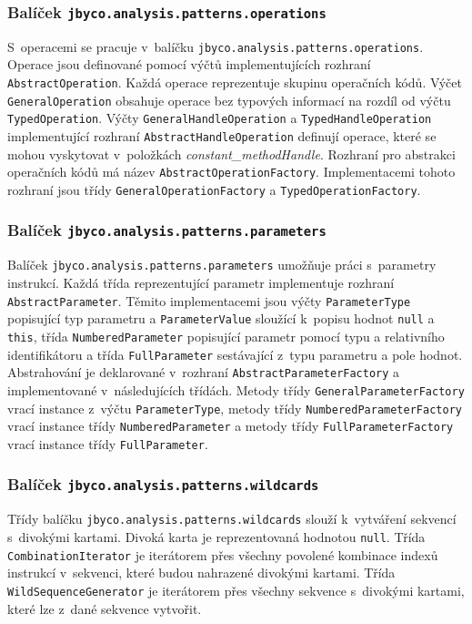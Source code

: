 \subsubsection{Balíček \texttt{jbyco.analysis.patterns.operations}}

S~operacemi se pracuje v~balíčku \texttt{jbyco.analysis.patterns.operations}. Operace jsou definované pomocí výčtů implementujících rozhraní \texttt{AbstractOperation}. Každá operace reprezentuje skupinu operačních kódů. Výčet \texttt{GeneralOperation} obsahuje operace bez typových informací na rozdíl od výčtu \texttt{TypedOperation}. Výčty \texttt{GeneralHandleOperation} a \texttt{TypedHandleOperation} implementující rozhraní \texttt{AbstractHandleOperation} definují operace, které se mohou vyskytovat v~položkách \textit{constant\_methodHandle}. Rozhraní pro abstrakci operačních kódů má název \texttt{AbstractOperationFactory}. Implementacemi tohoto rozhraní jsou třídy \texttt{GeneralOperationFactory} a \texttt{TypedOperationFactory}. 

\subsubsection{Balíček \texttt{jbyco.analysis.patterns.parameters}}

Balíček \texttt{jbyco.analysis.patterns.parameters} umožňuje práci s~parametry instrukcí. Každá třída reprezentující parametr implementuje rozhraní \texttt{AbstractParameter}. Těmito implementacemi jsou výčty \texttt{ParameterType} popisující typ parametru a \texttt{ParameterValue} sloužící k~popisu hodnot \texttt{null} a \texttt{this}, třída \texttt{NumberedParameter} popisující parametr pomocí typu a relativního identifikátoru a třída \texttt{FullParameter} sestávající z~typu parametru a pole hodnot. Abstrahování je deklarované v~rozhraní \texttt{AbstractParameterFactory} a implementované v~následujících třídách. Metody třídy \texttt{GeneralParameterFactory} vrací instance z~výčtu \texttt{ParameterType}, metody třídy \texttt{NumberedParameterFactory} vrací instance třídy \texttt{NumberedParameter} a metody třídy \texttt{FullParameterFactory} vrací instance třídy \texttt{FullParameter}.

\subsubsection{Balíček \texttt{jbyco.analysis.patterns.wildcards}}

Třídy balíčku \texttt{jbyco.analysis.patterns.wildcards} slouží k~vytváření sekvencí s~divokými kartami. Divoká karta je reprezentovaná hodnotou \texttt{null}. Třída \texttt{CombinationIterator} je iterátorem přes všechny povolené kombinace indexů instrukcí v~sekvenci, které budou nahrazené divokými kartami. Třída \texttt{WildSequenceGenerator} je iterátorem přes všechny sekvence s~divokými kartami, které lze z~dané sekvence vytvořit.

